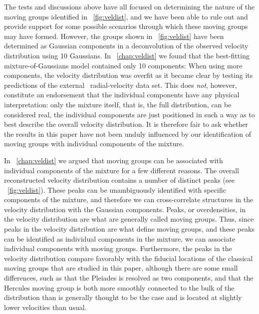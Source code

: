 The tests and discussions above have all focused on determining the
nature of the moving groups identified in
\figurename~\ref{fig:veldist}, and we have been able to rule out and
provide support for some possible scenarios through which these moving
groups may have formed. However, the groups shown in
\figurename~\ref{fig:veldist} have been determined as Gaussian
components in a deconvolution of the observed velocity distribution
using 10 Gaussians. In \chaptername~\ref{chap:veldist} we found that
the best-fitting mixture-of-Gaussians model contained only 10
components: When using more components, the velocity distribution was
overfit as it became clear by testing its predictions of the
external \gcsabb\ radial-velocity data set. This does \emph{not},
however, constitute an endorsement that the individual components have
any physical interpretation: only the mixture itself, that is, the
full distribution, can be considered real, the individual components
are just positioned in such a way as to best describe the overall
velocity distribution. It is therefore fair to ask whether the results
in this paper have not been unduly influenced by our identification of
moving groups with individual components of the mixture.

In \chaptername~\ref{chap:veldist} we argued that moving groups can be
associated with individual components of the mixture for a few
different reasons. The overall reconstructed velocity distribution
contains a number of distinct peaks
(see \figurename~\ref{fig:veldist}). These peaks can be unambiguously
identified with specific components of the mixture, and therefore we
can cross-correlate structures in the velocity distribution with the
Gaussian components. Peaks, or overdensities, in the velocity
distribution are what are generally called moving groups. Thus, since
peaks in the velocity distribution are what define moving groups, and
these peaks can be identified as individual components in the mixture,
we can associate individual components with moving
groups. Furthermore, the peaks in the velocity distribution compare
favorably with the fiducial locations of the classical moving groups
that are studied in this paper, although there are some small
differences, such as that the Pleiades is resolved as two components,
and that the Hercules moving group is both more smoothly connected to
the bulk of the distribution than is generally thought to be the case
and is located at slightly lower velocities than usual.

